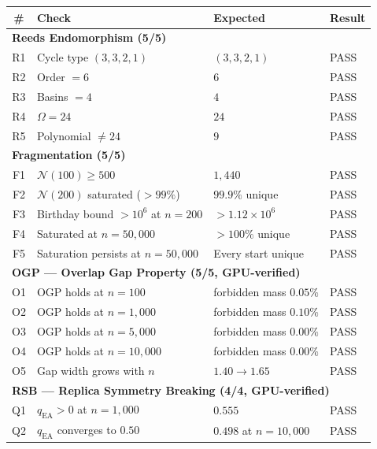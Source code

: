 \documentclass[11pt,a4paper]{article}
\theoremstyle{plain}
\theoremstyle{definition}
\theoremstyle{remark}
\begin{document}
\begin{center}
\small
\begin{tabular}{clll}
\toprule
\# & Check & Expected & Result \\
\midrule
\multicolumn{4}{l}{\textbf{Reeds Endomorphism (5/5)}} \\
R1 & Cycle type $(3,3,2,1)$ & $(3,3,2,1)$ & \textcolor{proved}{PASS} \\
R2 & Order $= 6$ & $6$ & \textcolor{proved}{PASS} \\
R3 & Basins $= 4$ & $4$ & \textcolor{proved}{PASS} \\
R4 & $\Omega = 24$ & $24$ & \textcolor{proved}{PASS} \\
R5 & Polynomial $\neq 24$ & $9$ & \textcolor{proved}{PASS} \\
\midrule
\multicolumn{4}{l}{\textbf{Fragmentation (5/5)}} \\
F1 & $\mathcal{N}(100) \geq 500$ & $1{,}440$ & \textcolor{proved}{PASS} \\
F2 & $\mathcal{N}(200)$ saturated ($>99\%$) & $99.9\%$ unique & \textcolor{proved}{PASS} \\
F3 & Birthday bound $> 10^6$ at $n = 200$ & $> 1.12 \times 10^6$ & \textcolor{proved}{PASS} \\
F4 & Saturated at $n = 50{,}000$ & $>100\%$ unique & \textcolor{proved}{PASS} \\
F5 & Saturation persists at $n = 50{,}000$ & Every start unique & \textcolor{proved}{PASS} \\
\midrule
\multicolumn{4}{l}{\textbf{OGP --- Overlap Gap Property (5/5, GPU-verified)}} \\
O1 & OGP holds at $n = 100$ & forbidden mass $0.05\%$ & \textcolor{proved}{PASS} \\
O2 & OGP holds at $n = 1{,}000$ & forbidden mass $0.10\%$ & \textcolor{proved}{PASS} \\
O3 & OGP holds at $n = 5{,}000$ & forbidden mass $\mathbf{0.00\%}$ & \textcolor{proved}{PASS} \\
O4 & OGP holds at $n = 10{,}000$ & forbidden mass $\mathbf{0.00\%}$ & \textcolor{proved}{PASS} \\
O5 & Gap width grows with $n$ & $1.40 \to 1.65$ & \textcolor{proved}{PASS} \\
\midrule
\multicolumn{4}{l}{\textbf{RSB --- Replica Symmetry Breaking (4/4, GPU-verified)}} \\
Q1 & $q_{\text{EA}} > 0$ at $n = 1{,}000$ & $0.555$ & \textcolor{proved}{PASS} \\
Q2 & $q_{\text{EA}}$ converges to $0.50$ & $0.498$ at $n = 10{,}000$ & \textcolor{proved}{PASS} \\

\end{tabular}
\end{center}
\end{document}
